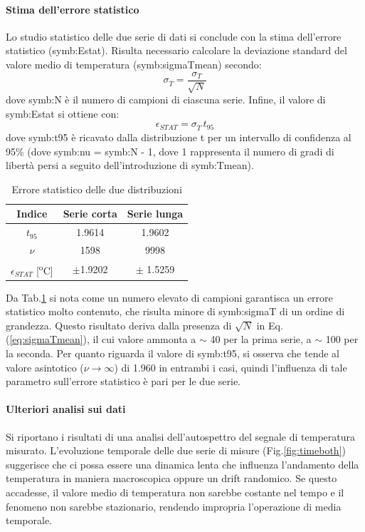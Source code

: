 \paragraph{Stima dell'errore statistico}
Lo studio statistico delle due serie di dati si conclude con la stima dell'errore statistico (\gls{symb:Estat}).  Risulta necessario calcolare la deviazione standard del valore medio di temperatura (\gls{symb:sigmaTmean}) secondo:
\begin{equation}
	\sigma_{\overline{T}} = \frac{\sigma_{T}}{\sqrt{N}} \label{eq:sigmaTmean}
\end{equation}
dove \gls{symb:N} è il numero di campioni di ciascuna serie.
Infine, il valore di \gls{symb:Estat} si ottiene con:
\begin{equation}
	\epsilon_{\textit{STAT}}=\sigma_{\overline{T}}\,t_{\textit{95}}
\end{equation}
dove \gls{symb:t95} è ricavato dalla distribuzione t per un intervallo di confidenza al 95\% (dove \gls{symb:nu} = \gls{symb:N} - 1, dove 1 rappresenta il numero di gradi di libertà persi a seguito dell'introduzione di \gls{symb:Tmean}).
\begin{table} [H]
	\centering
	\begin{tabular}{c|c|c}
		\toprule
		\toprule
		\textbf{Indice} & \textbf{Serie corta}&\textbf{Serie lunga}\\
		\midrule
		\midrule
		$t_{\textit{95}}$ &1.9614&1.9602\\
		\midrule
		$\nu$ & 1598 & 9998\\
		\midrule
		$\epsilon_{\textit{STAT}}$  [\textsuperscript{o}C]& $\pm $1.9202 &  $ \pm$ 1.5259\\
		\bottomrule
		\bottomrule
	\end{tabular}
	\caption{Errore statistico delle due distribuzioni}
	\label{tab:errorestat}
\end{table}

Da Tab.\ref{tab:errorestat} si nota come un numero elevato di campioni garantisca un errore statistico molto contenuto, che risulta minore di \gls{symb:sigmaT} di un ordine di grandezza. Questo risultato deriva dalla presenza di $\sqrt{N}$ in Eq.(\ref{eq:sigmaTmean}), il cui valore ammonta a $\sim$ 40 per la prima serie, a $\sim$ 100 per la seconda. Per quanto riguarda il valore di \gls{symb:t95}, si osserva che tende al valore asintotico ($\nu \rightarrow \infty $) di 1.960 in entrambi i casi, quindi l'influenza di tale parametro sull'errore statistico è pari per le due serie.

\paragraph{Ulteriori analisi sui dati}
Si riportano i risultati di una analisi dell'autospettro del segnale di temperatura misurato. L'evoluzione temporale delle due serie di misure (Fig.\ref{fig:timeboth}) suggerisce che ci possa essere una dinamica lenta che influenza l'andamento della temperatura in maniera macroscopica oppure un drift randomico. Se questo accadesse, il valore medio di temperatura non sarebbe costante nel tempo e il fenomeno non sarebbe stazionario, rendendo impropria l'operazione di media temporale.   

